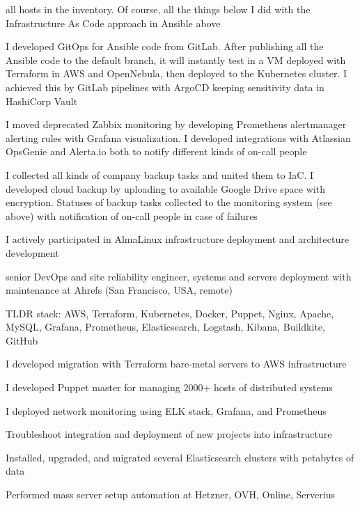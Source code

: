 {\begin{list}{●}
          all hosts in the inventory. Of course, all the things below I did with the
          Infrastructure As Code approach in Ansible above
    \item I developed GitOps for Ansible code from GitLab. After publishing all the
          Ansible code to the default branch, it will instantly test in a VM deployed
          with Terraform in AWS and OpenNebula, then deployed to the Kubernetes cluster.
          I achieved this by GitLab pipelines with ArgoCD keeping sensitivity data in
          HashiCorp Vault
    \item I moved deprecated Zabbix monitoring by developing Prometheus alertmanager
          alerting rules with Grafana visualization. I developed integrations with
          Atlassian OpsGenie and Alerta.io both to notify different kinds of on-call
          people
    \item I collected all kinds of company backup tasks and united them to IaC. I
          developed cloud backup by uploading to available Google Drive space with
          encryption. Statuses of backup tasks collected to the monitoring system (see
          above) with notification of on-call people in case of failures
    \item I actively participated in AlmaLinux infrastructure deployment and
          architecture development
          \PositonTail{}
    \item {}senior DevOps and site reliability
          engineer, systems and servers deployment with maintenance at Ahrefs (San
          Francisco, USA, remote)
          \PositonHead{}
    \item TLDR stack: AWS, Terraform, Kubernetes, Docker, Puppet, Nginx, Apache,
          MySQL, Grafana, Prometheus, Elasticsearch, Logstash, Kibana, Buildkite, GitHub
    \item I developed migration with Terraform bare-metal servers to AWS infrastructure
    \item I developed Puppet master for managing 2000+ hosts of distributed systems
    \item I deployed network monitoring using ELK stack, Grafana, and Prometheus
    \item Troubleshoot integration and deployment of new projects into infrastructure
    \item Installed, upgraded, and migrated several Elasticsearch clusters with
          petabytes of data
    \item Performed mass server setup automation at Hetzner, OVH, Online, Serverius

\end{list}}
